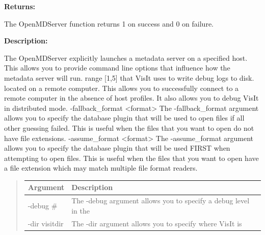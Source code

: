 \documentclass[letterpaper,10pt,english]{sphinxmanual}
\begin{document}
\begin{DUlineblock}{0em}
\item[] 
\item[] \textbf{Returns:}
\item[] The OpenMDServer function returns 1 on success and 0 on failure.
\item[] 
\item[] \textbf{Description:}
\item[] The OpenMDServer explicitly launches a metadata server on a specified
host. This allows you to provide command line options that influence how
the metadata server will run.
range {[}1,5{]} that VisIt uses to write debug logs to disk.
located on a remote computer. This allows you to successfully
connect to a remote computer in the absence of host profiles.
It also allows you to debug VisIt in distributed mode.
-fallback\_format \textless{}format\textgreater{}
The -fallback\_format argument allows you to specify the
database plugin that will be used to open files if all
other guessing failed. This is useful when the files
that you want to open do not have file extensions.
-assume\_format \textless{}format\textgreater{}
The -assume\_format argument allows you to specify the
database plugin that will be used FIRST when attempting
to open files. This is useful when the files that you
want to open have a file extension which may match
multiple file format readers.
\item[] 
\end{DUlineblock}
\begin{quote}

\begin{tabulary}{\linewidth}{|L|L|}
\hline

\textbf{Argument}
 & 
Description
\\
\hline
-debug \#
 & 
The -debug argument allows you to specify a debug level in the
\\
\hline
-dir visitdir
 & 
The -dir argument allows you to specify where VisIt is
\\
\hline\end{tabulary}

\end{quote}

\begin{DUlineblock}{0em}
\item[] 
\end{DUlineblock}
\end{document}
